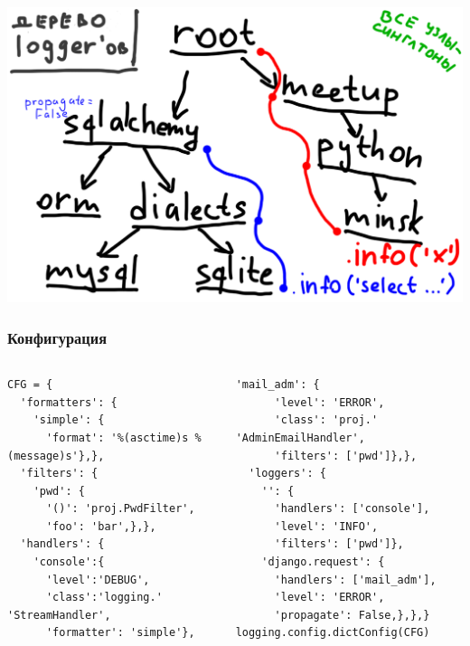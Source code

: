 \documentclass[aspectratio=169]{beamer}
\begin{document}
\begin{frame}
  \begin{center}
    \includegraphics[scale=0.63]{img/loggers5.png}
  \end{center}
\end{frame}


\begin{frame}[fragile]
  \frametitle{Конфигурация}
  \begin{columns}
    \begin{column}{.5\textwidth}

\begin{lstlisting}
CFG = {
  'formatters': {
    'simple': {
      'format': '%(asctime)s %(message)s'},},
  'filters': {
    'pwd': {
      '()': 'proj.PwdFilter',
      'foo': 'bar',},},
  'handlers': {
    'console':{
      'level':'DEBUG',
      'class':'logging.'       'StreamHandler',
      'formatter': 'simple'},
\end{lstlisting}

    \end{column}

    \begin{column}{.5\textwidth}
\begin{lstlisting}[firstnumber=14]
    'mail_adm': {
      'level': 'ERROR',
      'class': 'proj.'         'AdminEmailHandler',
      'filters': ['pwd']},},
  'loggers': {
    '': {
      'handlers': ['console'],
      'level': 'INFO',
      'filters': ['pwd']},
    'django.request': {
      'handlers': ['mail_adm'],
      'level': 'ERROR',
      'propagate': False,},},}
logging.config.dictConfig(CFG)
\end{lstlisting}
    \end{column}
  \end{columns}
\end{frame}
\end{document}
